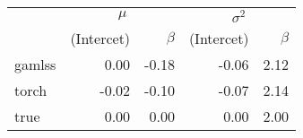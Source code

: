
\begin{tabular}[t]{lrrrr}
\toprule
\multicolumn{1}{c}{ } & \multicolumn{2}{c}{$\mu$} & \multicolumn{2}{c}{$\sigma^2$} \\
\cmidrule(l{3pt}r{3pt}){2-3} \cmidrule(l{3pt}r{3pt}){4-5}
  & (Intercet) & $\beta$ & (Intercet) & $\beta$\\
\midrule
gamlss & 0.00 & -0.18 & -0.06 & 2.12\\
torch & -0.02 & -0.10 & -0.07 & 2.14\\
true & 0.00 & 0.00 & 0.00 & 2.00\\
\bottomrule
\end{tabular}
